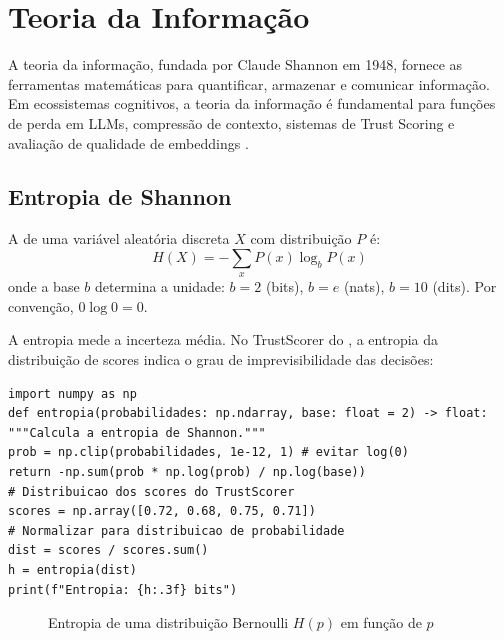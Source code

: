 \section{Teoria da Informação}
\label{sec:teoria-informação}
\nivelavancado
A teoria da informação, fundada por Claude Shannon em 1948, fornece as
ferramentas matemáticas para quantificar, armazenar e comunicar informação.
Em ecossistemas cognitivos, a teoria da informação é fundamental para
funções de perda em LLMs, compressão de contexto, sistemas de Trust Scoring
e avaliação de qualidade de embeddings \cite{cover2006elements,
goodfellow2016deep}.
\subsection{Entropia de Shannon}
\begin{definicao}[Entropia]
A  de uma variável aleatória discreta $X$ com
distribuição $P$ é:
\[H(X) = -\sum_{x} P(x) \log_b P(x)
\]
onde a base $b$ determina a unidade: $b = 2$ (bits), $b = e$ (nats),
$b = 10$ (dits). Por convenção, $0 \log 0 = 0$.
\end{definicao}
\begin{exemplo}
A entropia mede a incerteza média. No TrustScorer do \opencodeeco{}, a
entropia da distribuição de scores indica o grau de imprevisibilidade
das decisões:
\begin{lstlisting}[style=pythonstyle]
import numpy as np
def entropia(probabilidades: np.ndarray, base: float = 2) -> float:
"""Calcula a entropia de Shannon."""
prob = np.clip(probabilidades, 1e-12, 1) # evitar log(0)
return -np.sum(prob * np.log(prob) / np.log(base))
# Distribuicao dos scores do TrustScorer
scores = np.array([0.72, 0.68, 0.75, 0.71])
# Normalizar para distribuicao de probabilidade
dist = scores / scores.sum()
h = entropia(dist)
print(f"Entropia: {h:.3f} bits")
\end{lstlisting}
\end{exemplo}
\begin{figure}[htb]
\centering
\caption{Entropia de uma distribuição Bernoulli $H(p)$ em função de $p$}
\label{fig:entropia-bernoulli}
\end{figure}
